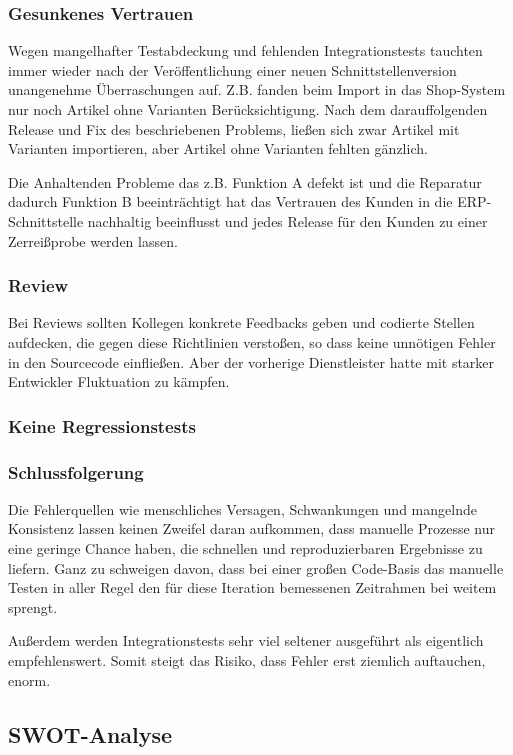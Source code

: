 \subsubsection{Gesunkenes Vertrauen}
Wegen mangelhafter Testabdeckung und fehlenden Integrationstests tauchten immer wieder nach der Veröffentlichung einer neuen Schnittstellenversion unangenehme Überraschungen auf. Z.B. fanden beim Import in das Shop-System nur noch Artikel ohne Varianten Berücksichtigung. Nach dem darauffolgenden Release und Fix des beschriebenen Problems, ließen sich zwar Artikel mit Varianten importieren, aber Artikel ohne Varianten fehlten gänzlich.

Die Anhaltenden Probleme das z.B. Funktion A defekt ist und die Reparatur dadurch Funktion B beeinträchtigt hat das Vertrauen des Kunden in die ERP-Schnittstelle nachhaltig beeinflusst und jedes Release für den Kunden zu einer Zerreißprobe werden lassen. 

\subsubsection{Review}
Bei Reviews sollten Kollegen konkrete Feedbacks geben und codierte Stellen aufdecken, die gegen diese Richtlinien verstoßen, so dass keine unnötigen Fehler in den Sourcecode einfließen. Aber der vorherige Dienstleister
hatte mit starker Entwickler Fluktuation zu kämpfen. 

\subsubsection{Keine Regressionstests}

\subsubsection{Schlussfolgerung}
Die Fehlerquellen wie menschliches Versagen, Schwankungen und mangelnde Konsistenz lassen keinen Zweifel daran aufkommen, dass manuelle Prozesse nur eine geringe Chance haben, die
schnellen und reproduzierbaren Ergebnisse zu liefern. Ganz zu schweigen davon, dass bei einer großen Code-Basis das manuelle Testen in aller Regel den für diese Iteration bemessenen Zeitrahmen
bei weitem sprengt.

Außerdem werden Integrationstests sehr viel seltener ausgeführt als eigentlich empfehlenswert. Somit steigt das Risiko, dass Fehler erst ziemlich auftauchen, enorm.  

\subsection{SWOT-Analyse}
